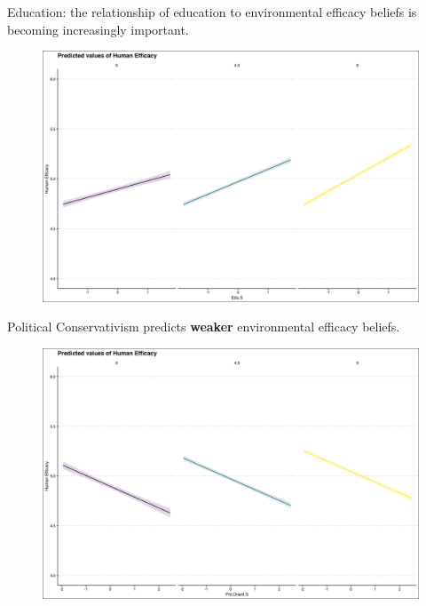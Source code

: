 \documentclass{beamer}
\begin{document}
\begin{frame}{Education: the relationship of education to environmental efficacy beliefs is becoming increasingly important.}
\begin{figure}
\includegraphics[width=.8\textwidth,height=\textheight,keepaspectratio]{Figures/EFFICACY_Edu.S.png}
\end{figure}
\end{frame}


\begin{frame}{Political Conservativism  predicts {\bf weaker} environmental efficacy beliefs.}
\begin{figure}
\includegraphics[width=.8\textwidth,height=\textheight,keepaspectratio]{Figures/EFFICACY_Pol.Orient.S.png}
\end{figure}
\end{frame}
\end{document}
